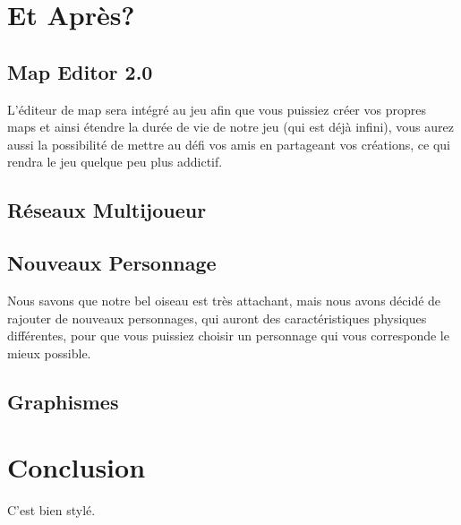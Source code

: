 \documentclass [11pt]{report}
\begin{document}
	
\chapter{Et Après?}
	\section{Map Editor 2.0}
	L'éditeur de map sera intégré au jeu afin que vous puissiez créer vos propres maps et ainsi étendre la durée de vie de notre jeu (qui est déjà infini), vous aurez aussi la possibilité de mettre au défi vos amis en partageant vos créations, ce qui rendra le jeu quelque peu plus addictif.
	
	
		
		\vspace{10mm}
	
	
	
	\section{Réseaux Multijoueur}


	
	\vspace{10mm}



	\section{Nouveaux Personnage}
	Nous savons que notre bel oiseau est très attachant, mais nous avons décidé de rajouter de nouveaux personnages, qui auront des caractéristiques physiques différentes, pour que vous puissiez choisir un personnage qui vous corresponde le mieux possible.
	
	
		
		\vspace{10mm}
	
	
	
	\section{Graphismes}
	
\newpage

\chapter*{Conclusion}

C'est bien stylé.
\end{document}
